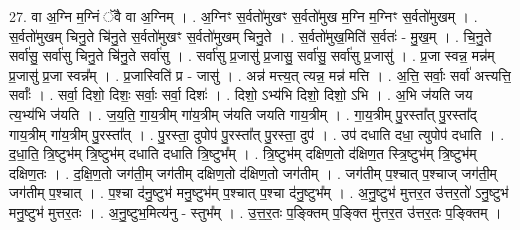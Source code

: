 \documentclass[17pt]{extarticle}
\begin{document}
27. वा अ॒ग्नि म॒ग्निं ॅवै वा अ॒ग्निम् । . अ॒ग्निꣳ स॒र्वतो॑मुखꣳ स॒र्वतो॑मुख म॒ग्नि म॒ग्निꣳ स॒र्वतो॑मुखम् । . स॒र्वतो॑मुखम् चिनु॒ते चि॑नु॒ते स॒र्वतो॑मुखꣳ स॒र्वतो॑मुखम् चिनु॒ते । . स॒र्वतो॑मुख॒मिति॑ स॒र्वतः॑ - मु॒ख॒म् । . चि॒नु॒ते सर्वा॑सु॒ सर्वा॑सु चिनु॒ते चि॑नु॒ते सर्वा॑सु । . सर्वा॑सु प्र॒जासु॑ प्र॒जासु॒ सर्वा॑सु॒ सर्वा॑सु प्र॒जासु॑ । . प्र॒जा स्वन्न॒ मन्न॑म् प्र॒जासु॑ प्र॒जा स्वन्न᳚म् । . प्र॒जास्विति॑ प्र - जासु॑ । . अन्न॑ मत्त्य॒त् त्यन्न॒ मन्न॑ मत्ति । . अ॒त्ति॒ सर्वाः॒ सर्वा॑ अत्त्यत्ति॒ सर्वाः᳚ । . सर्वा॒ दिशो॒ दिशः॒ सर्वाः॒ सर्वा॒ दिशः॑ । . दिशो॒ ऽभ्य॑भि दिशो॒ दिशो॒ ऽभि । . अ॒भि ज॑यति जय त्य॒भ्य॑भि ज॑यति । . ज॒य॒ति॒ गा॒य॒त्रीम् गा॑य॒त्रीम् ज॑यति जयति गाय॒त्रीम् । . गा॒य॒त्रीम् पु॒रस्ता᳚त् पु॒रस्ता᳚द् गाय॒त्रीम् गा॑य॒त्रीम् पु॒रस्ता᳚त् । . पु॒रस्ता॒ दुपोप॑ पु॒रस्ता᳚त् पु॒रस्ता॒ दुप॑ । . उप॑ दधाति दधा॒ त्युपोप॑ दधाति । . द॒धा॒ति॒ त्रि॒ष्टुभ॑म् त्रि॒ष्टुभ॑म् दधाति दधाति त्रि॒ष्टुभ᳚म् । . त्रि॒ष्टुभ॑म् दक्षिण॒तो द॑क्षिण॒त स्त्रि॒ष्टुभ॑म् त्रि॒ष्टुभ॑म् दक्षिण॒तः । . द॒क्षि॒ण॒तो जग॑ती॒म् जग॑तीम् दक्षिण॒तो द॑क्षिण॒तो जग॑तीम् । . जग॑तीम् प॒श्चात् प॒श्चाज् जग॑ती॒म् जग॑तीम् प॒श्चात् । . प॒श्चा द॑नु॒ष्टुभ॑ मनु॒ष्टुभ॑म् प॒श्चात् प॒श्चा द॑नु॒ष्टुभ᳚म् । . अ॒नु॒ष्टुभ॑ मुत्तर॒त उ॑त्तर॒तो॑ ऽनु॒ष्टुभ॑ मनु॒ष्टुभ॑ मुत्तर॒तः । . अ॒नु॒ष्टुभ॒मित्य॑नु - स्तुभ᳚म् । . उ॒त्त॒र॒तः प॒ङ्क्तिम् प॒ङ्क्ति मु॑त्तर॒त उ॑त्तर॒तः प॒ङ्क्तिम् । \newline
\end{document}
